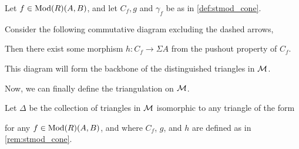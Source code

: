 \begin{remark}
    \label{rem:stmod_cone}
    Let \( f \in \operatorname{Mod}(R)(A, B) \), and let \( C_f, g \) and \( \gamma_f \) be as in \autoref{def:stmod_cone}.
    
    Consider the following commutative diagram excluding the dashed arrows,
    \begin{center}
    \end{center}
    Then there exist some morphism \( h: C_f \to \Sigma A \) from the pushout property of \( C_f \).

    This diagram will form the backbone of the distinguished triangles in \( {\mathcal{M}} \).
\end{remark}

Now, we can finally define the triangulation on \( {\mathcal{M}} \).

\begin{definition}
    \label{def:stmod_delta}
    Let \( \Delta \) be the collection of triangles in \( {\mathcal{M}} \) isomorphic to any triangle of the form
    \begin{center}
    \end{center}
    for any \( f \in \operatorname{Mod}(R)(A, B) \), and where \( C_f \), \( g \), and \( h \) are defined as in \autoref{rem:stmod_cone}.
\end{definition}


